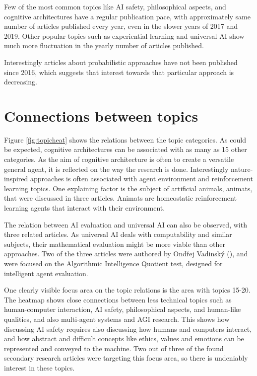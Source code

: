 \documentclass[utf8,english]{gradu3}
\begin{document}
Few of the most common topics like AI safety, philosophical aspects, and
cognitive architectures have a regular publication pace, with approximately same
number of articles published every year, even in the slower years of 2017 and
2019. Other popular topics such as experiential learning and universal AI show
much more fluctuation in the yearly number of articles published.

Interestingly articles about probabilistic approaches have not been published
since 2016, which suggests that interest towards that particular approach is
decreasing.


\section{Connections between topics}

Figure \ref{fig:topicheat} shows the relations between the topic categories. As
could be expected, cognitive architectures can be associated with as many as 15
other categories. As the aim of cognitive architecture is often to create a
versatile general agent, it is reflected on the way the research is done.
Interestingly nature-inspired approaches is often associated with agent
environment and reinforcement learning topics. One explaining factor is the
subject of artificial animals, animats, that were discussed in three articles.
Animats are homeostatic reinforcement learning agents that interact with their
environment. 

The relation between AI evaluation and universal AI can also be observed, with
three related articles. As universal AI deals with computability and similar
subjects, their mathematical evaluation might be more viable than other
approaches. Two of the three articles were authored by Ond\v rej
Vadinsk\'y (\cite*{vadinsky2018lessons,vadinsky2018sema}), and were focused on the
Algorithmic Intelligence Quotient test, designed for intelligent agent
evaluation.

One clearly visible focus area on the topic relations is the area with topics
15-20. The heatmap shows close connections between less technical topics such as
human-computer interaction, AI safety, philosophical aspects, and human-like
qualities, and also multi-agent systems and AGI research. This shows how
discussing AI safety requires also discussing how humans and computers interact,
and how abstract and difficult concepts like ethics, values and emotions can be
represented and conveyed to the machine. Two out of three of the found secondary
research articles were targeting this focus area, so there is undeniably
interest in these topics.
\end{document}
